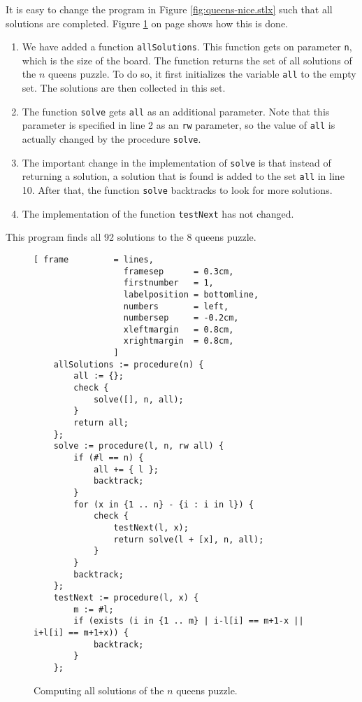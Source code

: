 It is easy to change the program in Figure \ref{fig:queens-nice.stlx} such that all
solutions are completed.   Figure \ref{fig:queens-all.stlx} on page
\pageref{fig:queens-all.stlx} shows how this is done.
\begin{enumerate}
\item We have added a function \texttt{allSolutions}.  This function gets on parameter
      \texttt{n}, which is the size of the board.
      The function returns the set of all solutions of the $n$ queens puzzle.
      To do so, it first initializes the variable \texttt{all} to the empty set.
      The solutions are then collected in this set.
\item The function \texttt{solve} gets \texttt{all} as an additional parameter.
      Note that this parameter is specified in line 2 as an \texttt{rw} parameter, so 
      the value of \texttt{all} is actually changed by the procedure \texttt{solve}.
\item The important change in the implementation of \texttt{solve} is that instead of
      returning a solution,  a solution that is found is added to the set \texttt{all} in
      line 10. After that, the function \texttt{solve} backtracks to look for more
      solutions. 
\item The implementation of the function \texttt{testNext} has not changed.
\end{enumerate}
This program finds all 92 solutions to the $8$ queens puzzle.

\begin{figure}[!ht]
\centering
\begin{Verbatim}[ frame         = lines, 
                  framesep      = 0.3cm, 
                  firstnumber   = 1,
                  labelposition = bottomline,
                  numbers       = left,
                  numbersep     = -0.2cm,
                  xleftmargin   = 0.8cm,
                  xrightmargin  = 0.8cm,
                ]
    allSolutions := procedure(n) {
        all := {};
        check {
            solve([], n, all);
        }
        return all;
    };
    solve := procedure(l, n, rw all) { 
        if (#l == n) {
            all += { l };
            backtrack;
        }
        for (x in {1 .. n} - {i : i in l}) {
            check {
                testNext(l, x);
                return solve(l + [x], n, all);
            } 
        }
        backtrack;
    };
    testNext := procedure(l, x) {
        m := #l;
        if (exists (i in {1 .. m} | i-l[i] == m+1-x || i+l[i] == m+1+x)) {
            backtrack;
        }
    };
\end{Verbatim}
\vspace*{-0.3cm}
\caption{Computing all solutions of the $n$ queens puzzle.}
\label{fig:queens-all.stlx}
\end{figure}


